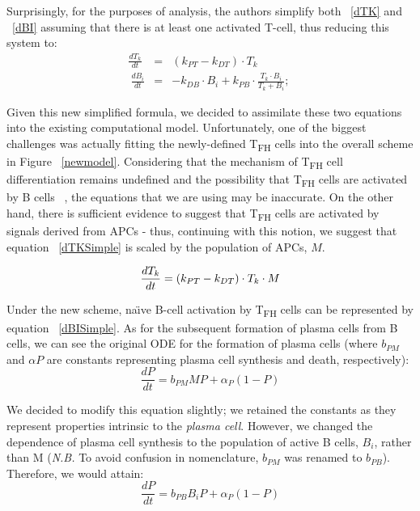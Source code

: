 \documentclass[a4paper, 12pt]{report}
\begin{document}
Surprisingly, for the purposes of analysis, the authors simplify both ~\ref{dTK} and ~\ref{dBI} assuming that there is at least one activated T-cell, thus reducing this system to:
\begin{eqnarray}
\frac{dT_k}{dt} &=& (k_{PT}-k_{DT}) \cdot T_k \\ ~\label{dTKSimple}
\frac{dB_i}{dt} &=& -k_{DB} \cdot B_i + k_{PB} \cdot \frac{T_{k} \cdot B_{i}}{T_{k}+B_{i}}; ~\label{dBISimple}
\end{eqnarray}

Given this new simplified formula, we decided to assimilate these two equations into the existing computational model. Unfortunately, one of the biggest challenges was actually fitting the newly-defined T\textsubscript{FH} cells into the overall scheme in Figure ~\ref{newmodel}. Considering that the mechanism of T\textsubscript{FH} cell differentiation remains undefined and the possibility that T\textsubscript{FH} cells are activated by B cells ~\cite{Crotty}, the equations that we are using may be inaccurate. On the other hand, there is sufficient evidence to suggest that T\textsubscript{FH} cells are activated by signals derived from APCs - thus, continuing with this notion, we suggest that equation ~\ref{dTKSimple} is scaled by the population of APCs, $M$.

\begin{equation}
\frac{dT_k}{dt} = (k_{PT}-k_{DT}) \cdot T_k \cdot M \\
\end{equation}

Under the new scheme, na\"\i ve B-cell activation by T\textsubscript{FH} cells can be represented by equation ~\ref{dBISimple}. As for the subsequent formation of plasma cells from B cells, we can see the original ODE for the formation of plasma cells (where $b_{PM}$ and $\alpha{P}$ are constants representing plasma cell synthesis and death, respectively):
\begin{equation}
\frac{dP}{dt} = b_{PM}MP + \alpha_{P}(1 - P)
\end{equation}

We decided to modify this equation slightly; we retained the constants as they represent properties intrinsic to the \emph{plasma cell}. However, we changed the dependence of plasma cell synthesis to the population of active B cells, $B_{i}$, rather than M (\emph{N.B. }To avoid confusion in nomenclature, $b_{PM}$ was renamed to $b_{PB}$). Therefore, we would attain:
\begin{equation}
\frac{dP}{dt} = b_{PB}B_{i}P + \alpha_{P}(1 - P)
\end{equation}
\end{document}
